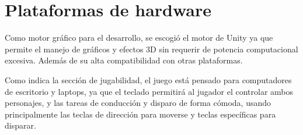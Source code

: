\section{Plataformas de hardware}
Como motor gráfico para el desarrollo, se escogió el motor de Unity ya que permite el manejo de gráficos y efectos 3D sin requerir de potencia computacional excesiva. Además de su alta compatibilidad con otras plataformas.

Como indica la sección de jugabilidad, el juego está pensado para computadores de escritorio y laptops, ya que el teclado permitirá al jugador el controlar ambos personajes, y las tareas de conducción y disparo de forma cómoda, usando principalmente las teclas de dirección para moverse y teclas específicas para disparar.
